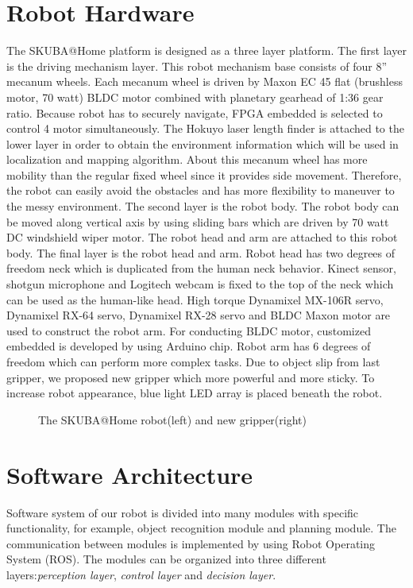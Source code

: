 \documentclass{llncs}
\begin{document}
\section{Robot Hardware}

The SKUBA@Home platform is designed as a three layer platform. The first layer is the driving mechanism layer. This robot mechanism base consists of four 8'' mecanum wheels. Each mecanum wheel is driven by Maxon EC 45 flat (brushless motor, 70 watt) BLDC motor combined with planetary gearhead of 1:36 gear ratio. Because robot has to securely navigate, FPGA embedded is selected to control 4 motor simultaneously. The Hokuyo laser length finder is attached to the lower layer in order to obtain the environment information which will be used in localization and mapping algorithm. About this mecanum wheel has more mobility than the regular fixed wheel since it provides side movement. Therefore, the robot can easily avoid the obstacles and has more flexibility to maneuver to the messy environment. The second layer is the robot body. The robot body can be moved along vertical axis by using sliding bars which are driven by 70 watt DC windshield wiper motor. The robot head and arm are attached to this robot body. The final layer is the robot head and arm. Robot head has two degrees of freedom neck which is duplicated from the human neck behavior. Kinect sensor, shotgun microphone and Logitech webcam is fixed to the top of the neck which can be used as the human-like head. High torque Dynamixel MX-106R servo, Dynamixel RX-64 servo, Dynamixel RX-28 servo and BLDC Maxon motor are used to construct the robot arm. For conducting BLDC motor, customized embedded is developed by using Arduino chip\cite{con_arm}. Robot arm has 6 degrees of freedom which can perform more complex tasks. Due to object slip from last gripper, we proposed new gripper which more powerful and more sticky. To increase robot appearance, blue light LED array is placed beneath the robot.

\begin{figure}
\centering
\caption{The SKUBA@Home robot(left) and new gripper(right)}
\label{fig:base}
\end{figure}

\section{Software Architecture}
Software system of our robot is divided into many modules with specific functionality, for example, object recognition module and planning module. The communication between modules is implemented by using Robot Operating System (ROS). The modules can be organized into three different layers:\textit{perception layer}, \textit{control layer} and \textit{decision layer}.
\end{document}
